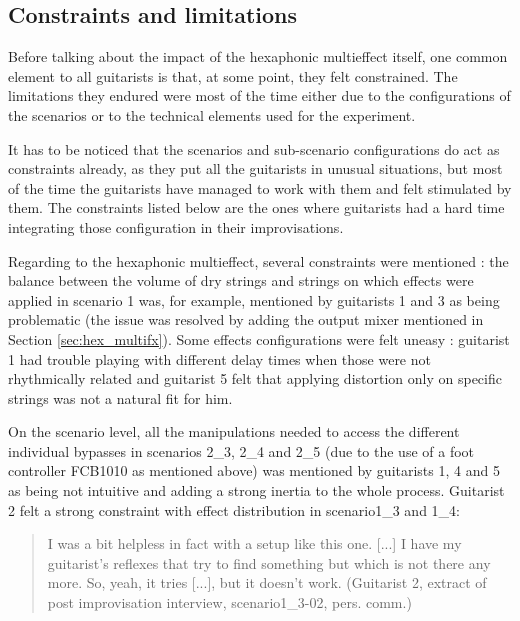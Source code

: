 \documentclass{article}
\begin{document}

\subsection{Constraints and limitations}
Before talking about the impact of the hexaphonic multieffect itself, one common element to all guitarists is that, at some point, they felt constrained. The limitations they endured were most of the time either due to the configurations of the scenarios or to the technical elements used for the experiment.

It has to be noticed that the scenarios and sub-scenario configurations do act as constraints already, as they put all the guitarists in unusual situations, but most of the time the guitarists have managed to work with them and felt stimulated by them. The constraints listed below are the ones where guitarists had a hard time integrating those configuration in their improvisations.

Regarding to the hexaphonic multieffect, several cons\-traints were mentioned : the balance between the volume of dry strings and strings on which effects were applied in scenario 1 was, for example, mentioned by guitarists 1 and 3 as being problematic (the issue was resolved by adding the output mixer mentioned in Section \ref{sec:hex_multifx}). Some effects configurations were felt uneasy : guitarist 1 had trouble playing with different delay times when those were not rhythmically related and guitarist 5 felt that applying distortion only on specific strings was not a natural fit for him. 

On the scenario level, all the manipulations needed to access the different individual bypasses in scenarios 2\_3, 2\_4 and 2\_5 (due to the use of a foot controller FCB1010 as mentioned above) was mentioned by guitarists 1, 4 and 5 as being not intuitive and adding a strong inertia to the whole process.
Guitarist 2 felt a strong constraint with effect distribution in scenario1\_3 and 1\_4:
    \begin{quote}
        I was a bit helpless in fact with a setup like this one. [...] I have my guitarist's reflexes that try to find something but which is not there any more. So, yeah, it tries [...], but it doesn't work. (Guitarist 2, extract of post improvisation interview, scenario1\_3-02, pers. comm.)
    \end{quote}
\end{document}
